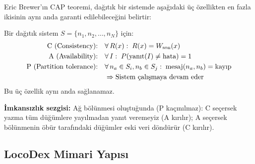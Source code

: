 Eric Brewer'{\i}n CAP teoremi, da\u{g}{\i}t{\i}k bir sistemde a\c{s}a\u{g}{\i}daki \"{u}\c{c} \"{o}zellikten en fazla ikisinin ayn{\i} anda garanti edilebilece\u{g}ini belirtir:

\begin{tanim}
\label{def:cap}
Bir da\u{g}{\i}t{\i}k sistem $S = \{n_1, n_2, \ldots, n_N\}$ i\c{c}in:
\begin{align}
\text{C (Consistency):}       &\quad \forall\, R(x):\; R(x) = W_{\mathrm{son}}(x) \label{eq:cap-c} \\
\text{A (Availability):}      &\quad \forall\, I:\; P(\text{yan{\i}t}(I) \neq \text{hata}) = 1 \label{eq:cap-a} \\
\text{P (Partition tolerance):}&\quad \forall\, n_a \in S_i, n_b \in S_j:\; \text{mesaj}(n_a, n_b) = \text{kay{\i}p} \nonumber \\
                               &\quad \Rightarrow \text{Sistem \c{c}al{\i}\c{s}maya devam eder} \label{eq:cap-p}
\end{align}
Bu \"{u}\c{c} \"{o}zellik ayn{\i} anda sa\u{g}lanamaz.
\end{tanim}

\textbf{\.{I}mkans{\i}zl{\i}k sezgisi:} A\u{g} b\"{o}l\"{u}nmesi olu\c{s}tu\u{g}unda (P ka\c{c}{\i}n{\i}lmaz): C se\c{c}ersek yazma t\"{u}m d\"{u}\u{g}\"{u}mlere yay{\i}lmadan yan{\i}t veremeyiz (A k{\i}r{\i}l{\i}r); A se\c{c}ersek b\"{o}l\"{u}nmenin \"{o}b\"{u}r taraf{\i}ndaki d\"{u}\u{g}\"{u}mler eski veri d\"{o}nd\"{u}r\"{u}r (C k{\i}r{\i}l{\i}r).

\subsection{LocoDex Mimari Yap{\i}s{\i}}
\label{sec:locodex-arch}

